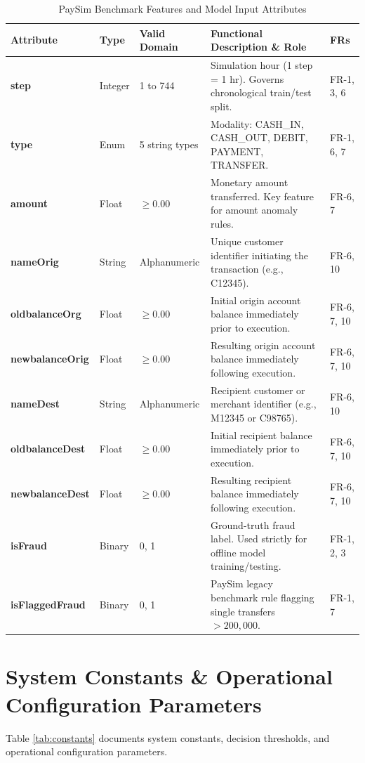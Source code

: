 \documentclass[12pt, a4paper]{report}
\begin{document}
\begin{table}[h]
\centering
\small
\begin{tabularx}{\textwidth}{|l|l|l|X|l|}
\hline
\rowcolor{tableheadbg}
\textbf{{Attribute}} & \textbf{{Type}} & \textbf{{Valid Domain}} & \textbf{{Functional Description \& Role}} & \textbf{{FRs}} \\
\hline
\textbf{step} & Integer & 1 to 744 & Simulation hour (1 step = 1 hr). Governs chronological train/test split. & FR-1, 3, 6 \\
\hline
\textbf{type} & Enum & 5 string types & Modality: CASH\_IN, CASH\_OUT, DEBIT, PAYMENT, TRANSFER. & FR-1, 6, 7 \\
\hline
\textbf{amount} & Float & $\ge 0.00$ & Monetary amount transferred. Key feature for amount anomaly rules. & FR-6, 7 \\
\hline
\textbf{nameOrig} & String & Alphanumeric & Unique customer identifier initiating the transaction (e.g., C12345). & FR-6, 10 \\
\hline
\textbf{oldbalanceOrg} & Float & $\ge 0.00$ & Initial origin account balance immediately prior to execution. & FR-6, 7, 10 \\
\hline
\textbf{newbalanceOrig} & Float & $\ge 0.00$ & Resulting origin account balance immediately following execution. & FR-6, 7, 10 \\
\hline
\textbf{nameDest} & String & Alphanumeric & Recipient customer or merchant identifier (e.g., M12345 or C98765). & FR-6, 10 \\
\hline
\textbf{oldbalanceDest} & Float & $\ge 0.00$ & Initial recipient balance immediately prior to execution. & FR-6, 7, 10 \\
\hline
\textbf{newbalanceDest} & Float & $\ge 0.00$ & Resulting recipient balance immediately following execution. & FR-6, 7, 10 \\
\hline
\textbf{isFraud} & Binary & 0, 1 & Ground-truth fraud label. Used strictly for offline model training/testing. & FR-1, 2, 3 \\
\hline
\textbf{isFlaggedFraud} & Binary & 0, 1 & PaySim legacy benchmark rule flagging single transfers $> 200,000$. & FR-1, 7 \\
\hline
\end{tabularx}
\caption{PaySim Benchmark Features and Model Input Attributes}
\label{tab:paysim}
\end{table}

\section{System Constants \& Operational Configuration Parameters}
Table \ref{tab:constants} documents system constants, decision thresholds, and operational configuration parameters.
\end{document}
